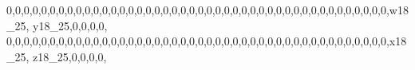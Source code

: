 \documentclass[]{article}
\newenvironment{Shaded}{\begin{snugshade}}{\end{snugshade}}
\newcommand{\DecValTok}[1]{\textcolor[rgb]{0.00,0.00,0.81}{#1}}
\newcommand{\NormalTok}[1]{#1}
\begin{document}
\begin{Shaded}
\begin{Highlighting}[]
\DecValTok{0}\NormalTok{,}\DecValTok{0}\NormalTok{,}\DecValTok{0}\NormalTok{,}\DecValTok{0}\NormalTok{,}\DecValTok{0}\NormalTok{,}\DecValTok{0}\NormalTok{,}\DecValTok{0}\NormalTok{,}\DecValTok{0}\NormalTok{,}\DecValTok{0}\NormalTok{,}\DecValTok{0}\NormalTok{,}\DecValTok{0}\NormalTok{,}\DecValTok{0}\NormalTok{,}\DecValTok{0}\NormalTok{,}\DecValTok{0}\NormalTok{,}\DecValTok{0}\NormalTok{,}\DecValTok{0}\NormalTok{,}\DecValTok{0}\NormalTok{,}\DecValTok{0}\NormalTok{,}\DecValTok{0}\NormalTok{,}\DecValTok{0}\NormalTok{,}\DecValTok{0}\NormalTok{,}\DecValTok{0}\NormalTok{,}\DecValTok{0}\NormalTok{,}\DecValTok{0}\NormalTok{,}\DecValTok{0}\NormalTok{,}\DecValTok{0}\NormalTok{,}\DecValTok{0}\NormalTok{,}\DecValTok{0}\NormalTok{,}\DecValTok{0}\NormalTok{,}\DecValTok{0}\NormalTok{,}\DecValTok{0}\NormalTok{,}\DecValTok{0}\NormalTok{,}\DecValTok{0}\NormalTok{,}\DecValTok{0}\NormalTok{,}\DecValTok{0}\NormalTok{,}\DecValTok{0}\NormalTok{,}\DecValTok{0}\NormalTok{,}\DecValTok{0}\NormalTok{,}\DecValTok{0}\NormalTok{,}\DecValTok{0}\NormalTok{,}\DecValTok{0}\NormalTok{,}\DecValTok{0}\NormalTok{,}\DecValTok{0}\NormalTok{,}\DecValTok{0}\NormalTok{,w18_}\DecValTok{25}\NormalTok{, y18_}\DecValTok{25}\NormalTok{,}\DecValTok{0}\NormalTok{,}\DecValTok{0}\NormalTok{,}\DecValTok{0}\NormalTok{,}\DecValTok{0}\NormalTok{,}
\DecValTok{0}\NormalTok{,}\DecValTok{0}\NormalTok{,}\DecValTok{0}\NormalTok{,}\DecValTok{0}\NormalTok{,}\DecValTok{0}\NormalTok{,}\DecValTok{0}\NormalTok{,}\DecValTok{0}\NormalTok{,}\DecValTok{0}\NormalTok{,}\DecValTok{0}\NormalTok{,}\DecValTok{0}\NormalTok{,}\DecValTok{0}\NormalTok{,}\DecValTok{0}\NormalTok{,}\DecValTok{0}\NormalTok{,}\DecValTok{0}\NormalTok{,}\DecValTok{0}\NormalTok{,}\DecValTok{0}\NormalTok{,}\DecValTok{0}\NormalTok{,}\DecValTok{0}\NormalTok{,}\DecValTok{0}\NormalTok{,}\DecValTok{0}\NormalTok{,}\DecValTok{0}\NormalTok{,}\DecValTok{0}\NormalTok{,}\DecValTok{0}\NormalTok{,}\DecValTok{0}\NormalTok{,}\DecValTok{0}\NormalTok{,}\DecValTok{0}\NormalTok{,}\DecValTok{0}\NormalTok{,}\DecValTok{0}\NormalTok{,}\DecValTok{0}\NormalTok{,}\DecValTok{0}\NormalTok{,}\DecValTok{0}\NormalTok{,}\DecValTok{0}\NormalTok{,}\DecValTok{0}\NormalTok{,}\DecValTok{0}\NormalTok{,}\DecValTok{0}\NormalTok{,}\DecValTok{0}\NormalTok{,}\DecValTok{0}\NormalTok{,}\DecValTok{0}\NormalTok{,}\DecValTok{0}\NormalTok{,}\DecValTok{0}\NormalTok{,}\DecValTok{0}\NormalTok{,}\DecValTok{0}\NormalTok{,}\DecValTok{0}\NormalTok{,}\DecValTok{0}\NormalTok{,x18_}\DecValTok{25}\NormalTok{, z18_}\DecValTok{25}\NormalTok{,}\DecValTok{0}\NormalTok{,}\DecValTok{0}\NormalTok{,}\DecValTok{0}\NormalTok{,}\DecValTok{0}\NormalTok{,}

\end{Highlighting}
\end{Shaded}
\end{document}
